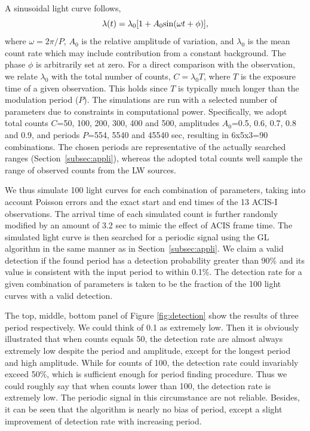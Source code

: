 \documentclass[twoside,twocolumn]{aastex63}
\begin{document}
A sinusoidal light curve follows,
\begin{equation}
\lambda (t)=\lambda_0[1+A_{0}{\rm sin}(\omega t+\phi)], 
\label{eqn:sin}
\end{equation}
where $\omega = 2{\pi}/P$, $A_0$ is the relative amplitude of variation, and $\lambda_0$ is the mean count rate which may include contribution from a constant background. The phase $\phi$ is arbitrarily set at zero.
For a direct comparison with the observation, we relate $\lambda_0$ with the total number of counts, $C = \lambda_0 T$, where $T$ is the exposure time of a given observation. This holds since $T$ is typically much longer than the modulation period ($P$). 
The simulations are run with a selected number of parameters due to constraints in computational power. 
Specifically, we adopt total counts $C$=50, 100, 200, 300, 400 and 500, amplitudes $A_0$=0.5, 0.6, 0.7, 0.8 and 0.9, and periods $P$=554, 5540 and 45540 sec, resulting in 6x5x3=90 combinations. 
The chosen periods are representative of the actually searched ranges (Section~\ref{subsec:appli}), whereas
the adopted total counts well sample the range of observed counts from the LW sources.

We thus simulate 100 light curves for each combination of parameters, taking into account Poisson errors and the exact start and end times of the 13 ACIS-I observations. 
 The arrival time of each simulated count is further randomly modified by an amount of 3.2 sec to mimic the effect of ACIS frame time.
The simulated light curve is then searched for a periodic signal using the GL algorithm in the same manner as in Section~\ref{subsec:appli}.
We claim a valid detection if the found period has a detection probability greater than 90\% and its value is consistent with the input period to within 0.1\%. 
The detection rate for a given combination of parameters is taken to be the fraction of the 100 light curves with a valid detection.

The top, middle, bottom panel of Figure \ref{fig:detection} show the results of three period respectively. 
We could think of 0.1 as extremely low. Then it is obviously illustrated that when counts equals 50, the detection rate are almost always extremely low despite the period and amplitude, except for the longest period and high amplitude. While for counts of 100, the detection rate could invariably exceed 50\%, which is sufficient enough for period finding procedure. Thus we could roughly say that when counts lower than 100, the detection rate is extremely low. The periodic signal in this circumstance are not reliable. Besides, it can be seen that the algorithm is nearly no bias of period, except a slight improvement of detection rate with increasing period.
 
\end{document}
